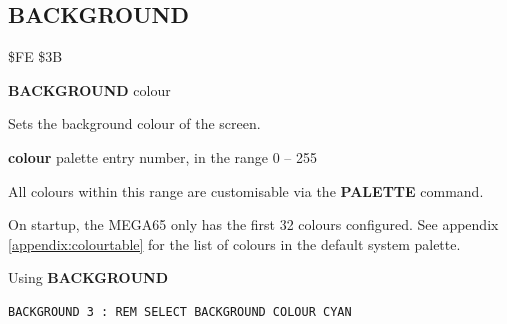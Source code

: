 \subsection{BACKGROUND}
\begin{description}[leftmargin=2cm,style=nextline]
\item [Token:]   \$FE \$3B

\item [Format:]  {\bf BACKGROUND} colour

\item [Usage:]   Sets the background colour of the screen.

                 {\bf colour} palette entry number, in the range 0 -- 255

                 All colours within this range are customisable via the {\bf PALETTE} command.

                 On startup, the MEGA65 only has the first 32 colours configured. See appendix \vref{appendix:colourtable} for the list of colours in the default system palette.

\item [Example:] Using {\bf BACKGROUND}

\begin{tcolorbox}[colback=black,coltext=white]
\verbatimfont{\codefont}
\begin{verbatim}
BACKGROUND 3 : REM SELECT BACKGROUND COLOUR CYAN
\end{verbatim}
\end{tcolorbox}
\end{description}


\newpage
